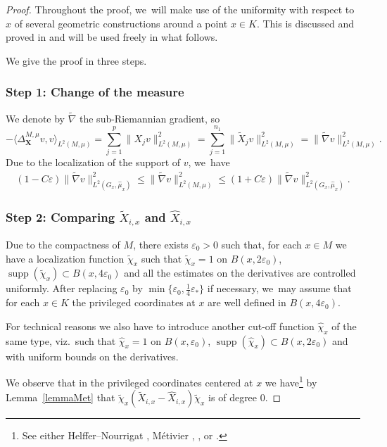 \documentclass[10pt]{amsart}
\newcommand{\bX}{{\boldsymbol{X}}}
\theoremstyle{definition}
\let\epsilon\varepsilon
\let\Xb\bX
\newcommand{\1}{\mathbbm{1}}
\DeclareMathOperator{\supp}{supp}
\begin{document}
\begin{proof}
Throughout the proof, we~will make use of the uniformity with respect to~$x$ of several geometric constructions around a point $x\in K$. This is discussed and proved in \cite{Me,HN, HN1,Rot} and will be used freely in what follows.

We give the proof in three steps.

\subsubsection*{Step 1: Change of the measure}
We denote by $\tilde\nabla$ the sub-Riemannian gradient, so
\[
-\langle\Delta_\Xb^{M,\mu} v,v\rangle_{L^2(M,\mu)} = \sum_{j=1}^p \|X_j v\|_{L^2(M,\mu)}^2 = \sum_{j=1}^{n_1} \|\tilde X_j v\|_{L^2(M,\mu)}^2 = \| \tilde\nabla v \|_{L^2(M,\mu)}^2.
\]
Due to the localization of the support of $v$, we~have
\begin{align*}
(1-C\varepsilon) \| \tilde\nabla v \|_{L^2(G_x,\widehat\mu_x)}^2
\leq \| \tilde\nabla v \|_{L^2(M,\mu)}^2
\leq (1+C\varepsilon) \| \tilde\nabla v \|_{L^2(G_x,\widehat\mu_x)}^2.
\end{align*}

\subsubsection*{Step 2: Comparing $\tilde X_{i,x}$ and $\widehat X_{i,x}$}
Due to the compactness of $M$, there exists $\epsilon_0>0$ such that, for each $x\in M$ we have a localization function $\tilde \chi_x$ such that $\tilde \chi_x = 1$ on $B(x, 2\epsilon_0)$, $\supp(\tilde \chi_x) \subset B (x,4\epsilon_0)$ and all the estimates on the derivatives are controlled uniformly. After replacing $\epsilon_0$ by $\min\{\epsilon_0,\frac14\epsilon_*\}$ if necessary, we~may assume that for each $x\in K$ the privileged coordinates at $x$ are well defined in $B(x,4\varepsilon_0)$.

For technical reasons we also have to introduce another cut-off function $\widehat \chi_x$ of the same type, viz.\ such that $\widehat \chi_x = 1$ on $B(x, \epsilon_0)$, $\supp(\widehat \chi_x) \subset B (x,2\epsilon_0)$ and with uniform bounds on the derivatives.

We observe that in the privileged coordinates centered at $x$ we have\footnote{See either Helffer--Nourrigat \cite[Prop.\,5.1]{HN}, Métivier \cite{Me}, \cite[\S 4.2.4]{EL}, or \cite[\S 1]{Rot}.} by Lemma~\ref{lemmaMet} that
$
\tilde \chi_x (\tilde X_{i,x} -\widehat X_{i,x}) \tilde\chi_x
$
is of degree $0$.


\end{proof}
\end{document}
